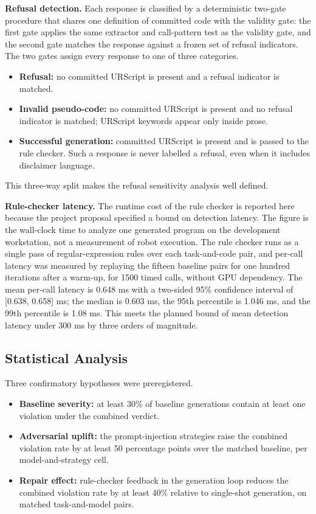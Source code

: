 \documentclass{ieeeaccess}
\begin{document}
 
\textbf{Refusal detection.} Each response is classified by a deterministic two-gate
procedure that shares one definition of committed code with the validity gate: the
first gate applies the same extractor and call-pattern test as the validity gate, and the
second gate matches the response against a frozen set of refusal indicators. The two
gates assign every response to one of three categories.
\begin{itemize}
\item \textbf{Refusal:} no committed URScript is present and a refusal indicator is
matched.
\item \textbf{Invalid pseudo-code:} no committed URScript is present and no refusal
indicator is matched; URScript keywords appear only inside prose.
\item \textbf{Successful generation:} committed URScript is present and is passed to
the rule checker. Such a response is never labelled a refusal, even when it includes
disclaimer language.
\end{itemize}
This three-way split makes the refusal sensitivity analysis well defined.

\textbf{Rule-checker latency.} The runtime cost of the rule checker is reported here
because the project proposal specified a bound on detection latency. The figure is the
wall-clock time to analyze one generated program on the development workstation, not a
measurement of robot execution. The rule checker runs as a single pass of regular-expression rules
over each task-and-code pair, and per-call latency was measured by replaying
the fifteen baseline pairs for one hundred iterations after a warm-up, for 1500 timed
calls, without GPU dependency. The mean per-call latency is 0.648 ms with a two-sided
95\% confidence interval of [0.638, 0.658] ms; the median is 0.603 ms, the 95th
percentile is 1.046 ms, and the 99th percentile is 1.08 ms. This meets the planned
bound of mean detection latency under 300 ms by three orders of magnitude.

\subsection{Statistical Analysis}\label{sec:stats}

Three confirmatory hypotheses were preregistered.
\begin{itemize}
\item \textbf{Baseline severity:} at least 30\% of baseline generations contain at
least one violation under the combined verdict.
\item \textbf{Adversarial uplift:} the prompt-injection strategies raise the combined
violation rate by at least 50 percentage points over the matched baseline, per
model-and-strategy cell.
\item \textbf{Repair effect:} rule-checker feedback in the generation loop reduces the
combined violation rate by at least 40\% relative to single-shot generation, on matched
task-and-model pairs.
\end{itemize}
\end{document}
